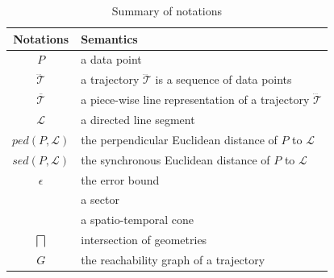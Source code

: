 	\begin{table}
		\renewcommand{\arraystretch}{1.20}
		\vspace{-1ex}
		\caption{\small Summary of notations}
		\centering
		\small
		\begin{tabular}{|c|l|}
			\hline
			{\bf Notations}& {\bf Semantics}   \\		\hline %
			$P$ & a data point \\		\hline
			$\dddot{\mathcal{T}}$ & a trajectory $\dddot{\mathcal{T}}$ is a sequence of data points\\		\hline
			$\overline{\mathcal{T}}$&  {a piece-wise line representation of a trajectory $\dddot{\mathcal{T}}$}	\\		\hline
			$\mathcal{L}$ & a directed line segment  \\		\hline
			$ped(P, \mathcal{L})$ &  {the perpendicular Euclidean distance of $P$ to $\mathcal{L}$}	\\	\hline
			$sed(P, \mathcal{L})$ & {the synchronous Euclidean distance of $P$ to $\mathcal{L}$} 	\\		\hline
			$\epsilon$ & the error bound \\		\hline
			\sector{} & a sector \\		\hline
			\cone{} & a spatio-temporal cone \\		\hline
			$\bigsqcap$ & intersection of geometries\\		\hline
			$G$ &	the reachability graph of a trajectory\\		\hline
		\end{tabular}
		\label{tab:notations}
		\vspace{-1ex}
	\end{table}



